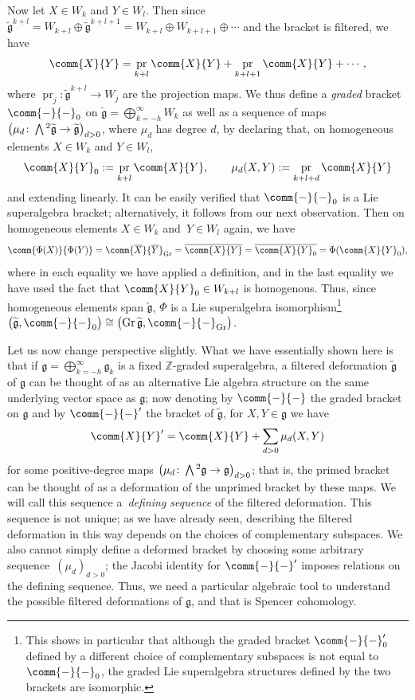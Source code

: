 \documentclass[pdftex]{sigma}
\numberwithin{equation}{section}
\newcommand{\fg}{\mathfrak{g}}
\newcommand{\ZZ}{\mathbb{Z}}
\newcommand{\fgtilde}{\widetilde{\mathfrak{g}}}
\newcommand{\Wedge}{\mathchoice{{\textstyle\bigwedge}}{\bigwedge}{\bigwedge}{\bigwedge}}	%
\newcommand{\1}{\mathbbm{1}}
\DeclareMathOperator{\Gr}{Gr}
\DeclareMathOperator{\pr}{pr}
\begin{document}
Now let $X\in W_k$ and $Y\in W_l$. Then since $\fgtilde^{k+l} = W_{k+l}\oplus\fgtilde^{k+l+1} = W_{k+l}\oplus W_{k+l+1}\oplus\cdots$ and the bracket is filtered, we have
\[
	\comm{X}{Y} = \pr_{k+l}\comm{X}{Y} + \pr_{k+l+1}\comm{X}{Y} + \cdots,
\]
where $\pr_j\colon\fgtilde^{k+l}\to W_j$ are the projection maps. We thus define a \emph{graded} bracket $\comm{-}{-}_0$ on $\fgtilde=\bigoplus_{k=-h}^\infty W_k$ as well as a sequence of maps $\bigl(\mu_d\colon\Wedge^2\fgtilde\to\fgtilde\bigr)_{d> 0}$, where $\mu_d$ has degree $d$, by declaring that, on homogeneous elements $X\in W_k$ and $Y\in W_l$,
\[
	\comm{X}{Y}_0 := \pr_{k+l}\comm{X}{Y},	\qquad \mu_d(X,Y) := \pr_{k+l+d}\comm{X}{Y}
\]
and extending linearly. It can be easily verified that $\comm{-}{-}_0$ is a Lie superalgebra bracket; alternatively, it follows from our next observation. Then on homogeneous elements $X\in W_k$ and~${Y\in W_l}$ again, we have
\[
	\comm{\Phi(X)}{\Phi(Y)} = \comm{\overline{X}}{\overline{Y}}_{\mathrm{Gr}} = \overline{\comm{X}{Y}} = \overline{\comm{X}{Y}_0} = \Phi(\comm{X}{Y}_0),
\]
where in each equality we have applied a definition, and in the last equality we have used the fact that $\comm{X}{Y}_0\in W_{k+l}$ is homogenous. Thus, since homogeneous elements span $\fgtilde$, $\Phi$ is a Lie superalgebra isomorphism\footnote{This shows in particular that although the graded bracket $\comm{-}{-}'_0$ defined by a different choice of complementary subspaces is not equal to $\comm{-}{-}_0$, the graded Lie superalgebra structures defined by the two brackets are isomorphic.}
$\bigl(\fgtilde,\comm{-}{-}_0\bigr)\cong \bigl(\Gr\fgtilde,\comm{-}{-}_{\mathrm{Gr}}\bigr)$.

Let us now change perspective slightly. What we have essentially shown here is that if $\fg=\bigoplus_{k=-h}^\infty\fg_k$ is a fixed $\ZZ$-graded superalgebra, a filtered deformation $\fgtilde$ of $\fg$ can be thought of as an alternative Lie algebra structure on the same underlying vector space as $\fg$; now denoting by $\comm{-}{-}$ the graded bracket on $\fg$ and by $\comm{-}{-}'$ the bracket of $\fgtilde$, for $X,Y\in\fg$ we have
\begin{equation}\label{eq:defining-sequence}
	\comm{X}{Y}' = \comm{X}{Y} + \sum_{d>0}\mu_d(X,Y)
\end{equation}
for some positive-degree maps $\bigl(\mu_d\colon\Wedge^2\fg\to\fg\bigr)_{d> 0}$; that is, the primed bracket can be thought of as a deformation of the unprimed bracket by these maps. We will call this sequence a~\emph{defining sequence} of the filtered deformation. This sequence is not unique; as we have already seen, describing the filtered deformation in this way depends on the choices of complementary subspaces. We also cannot simply define a deformed bracket by choosing some arbitrary sequence~$(\mu_d)_{d>0}$; the Jacobi identity for $\comm{-}{-}'$ imposes relations on the defining sequence. Thus, we need a particular algebraic tool to understand the possible filtered deformations of $\fg$, and that is Spencer cohomology.
\end{document}
